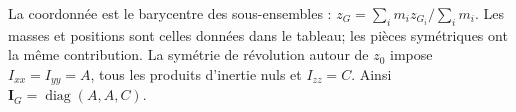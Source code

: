 \begin{corrigebox}
La coordonnée est le barycentre des sous-ensembles :
                $\boxed{z_G=\sum_i m_i z_{G_i}/\sum_i m_i}$. Les masses et positions sont
                celles données dans le tableau; les pièces symétriques ont la même
                contribution.
La symétrie de révolution autour de $z_0$ impose
                $I_{xx}=I_{yy}=A$, tous les produits d'inertie nuls et
                $I_{zz}=C$. Ainsi $\mathbf I_G=\operatorname{diag}(A,A,C)$.
\end{corrigebox}
